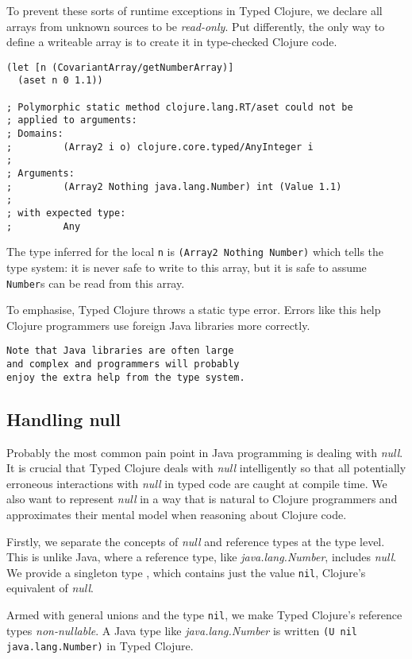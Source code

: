 \documentclass[preprint,10pt]{sigplanconf}
\begin{document}
To prevent these sorts of runtime exceptions in Typed Clojure, we declare
all arrays from unknown sources to be \emph{read-only}. Put differently,
the only way to define a writeable array is to create it in type-checked Clojure
code.

\begin{lstlisting}
(let [n (CovariantArray/getNumberArray)]
  (aset n 0 1.1))

; Polymorphic static method clojure.lang.RT/aset could not be 
; applied to arguments:
; Domains: 
;         (Array2 i o) clojure.core.typed/AnyInteger i
; 
; Arguments:
;         (Array2 Nothing java.lang.Number) int (Value 1.1)
; 
; with expected type:
;         Any
\end{lstlisting}

The type inferred for the local \lstinline|n| is \lstinline|(Array2 Nothing Number)|
which tells the type system: it is never safe to write to this array, but
it is safe to assume \lstinline|Number|s can be read from this array.

To emphasise, Typed Clojure throws a static type error. Errors like this help Clojure programmers
use foreign Java libraries more correctly.

\begin{verbatim}
Note that Java libraries are often large 
and complex and programmers will probably
enjoy the extra help from the type system.
\end{verbatim}

\subsection{Handling null}
\label{sec:null}

Probably the most common pain point in Java programming is dealing with \emph{null}.
It is crucial that Typed Clojure deals with \emph{null} intelligently so that
all potentially erroneous interactions with \emph{null} in typed code are caught at compile time.
We also want to represent \emph{null} in a way that is natural to Clojure programmers
and approximates their mental model when reasoning about Clojure code.

Firstly, we separate the concepts of \emph{null} and reference types at the type level.
This is unlike Java, where a reference type, like \emph{java.lang.Number}, includes \emph{null}.
We provide a singleton type \Nil{}, which contains just the value \lstinline|nil|,
Clojure's equivalent of \emph{null}. 

Armed with general unions and the type \lstinline|nil|, 
we make Typed Clojure's reference types \emph{non-nullable}.
A Java type like \emph{java.lang.Number} is written \lstinline|(U nil java.lang.Number)|
in Typed Clojure.
\end{document}
